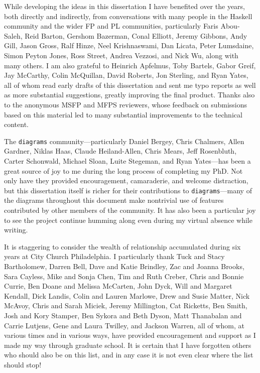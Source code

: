 While developing the ideas in this dissertation I have benefited over
the years, both directly and indirectly, from conversations with many
people in the Haskell community and the wider FP and PL communities,
particularly Faris Abou-Saleh, Reid Barton, Gershom Bazerman, Conal
Elliott, Jeremy Gibbons, Andy Gill, Jason Gross, Ralf Hinze, Neel
Krishnaswami, Dan Licata, Peter Lumsdaine, Simon Peyton Jones, Ross
Street, Andrea Vezzosi, and Nick Wu, along with many others.  I am
also grateful to Heinrich Apfelmus, Toby Bartels, Gabor Greif, Jay
McCarthy, Colin McQuillan, David Roberts, Jon Sterling, and Ryan
Yates, all of whom read early drafts of this dissertation and sent me
typo reports as well as more substantial suggestions, greatly
improving the final product.  Thanks also to the anonymous MSFP and
MFPS reviewers, whose feedback on submissions based on this material
led to many substantial improvements to the technical content.

The \texttt{diagrams} community---particularly Daniel Bergey, Chris
Chalmers, Allen Gardner, Niklas Haas, Claude Heiland-Allen, Chris
Mears, Jeff Rosenbluth, Carter Schonwald, Michael Sloan, Luite
Stegeman, and Ryan Yates---has been a great source of joy to me during
the long process of completing my PhD.  Not only have they provided
encouragement, camaraderie, and welcome distraction, but this
dissertation itself is richer for their contributions to
\texttt{diagrams}---many of the diagrams throughout this document make
nontrivial use of features contributed by other members of the
community.  It has also been a particular joy to see the project
continue humming along even during my virtual absence while writing.

It is staggering to consider the wealth of relationship accumulated
during six years at City Church Philadelphia.  I particularly thank
Tuck and Stacy Bartholomew, Darren Bell, Dave and Katie Brindley, Zac
and Joanna Brooks, Sara Cayless, Mike and Sonja Chen, Tim and Ruth
Creber, Chris and Bonnie Currie, Ben Doane and Melissa McCarten, John
Dyck, Will and Margaret Kendall, Dick Landis, Colin and Lauren
Marlowe, Drew and Susie Matter, Nick McAvoy, Chris and Sarah Miciek,
Jeremy Millington, Cat Ricketts, Ben Smith, Josh and Kory Stamper, Ben
Sykora and Beth Dyson, Matt Thanabalan and Carrie Lutjens, Gene and
Laura Twilley, and Jackson Warren, all of whom, at various times and
in various ways, have provided encouragement and support as I made my
way through graduate school. It is certain that I have forgotten
others who should also be on this list, and in any case it is not even
clear where the list should stop!

